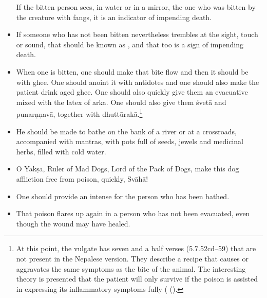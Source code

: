 \begin{translation}
\begin{itemize}
If the bitten person sees, in water or in a mirror, the one who was bitten by 
the creature with fangs, it is an indicator of impending death.

\item [48cd--49ab]

If someone who has not been bitten nevertheless trembles at the sight, touch 
or sound, that should be known as , and that too 
is a sign of impending death.

\item[50cd--52ab]
        
When one is bitten, one should make that bite flow and then it should
be  with ghee.  One should anoint it with
antidotes and one should also make the patient
drink aged ghee.  One should also quickly give them an evacuative
mixed with the latex of \gls{arka}.  One should also give them
\gls{śvetā} and \gls{punarṇṇavā}, together with
\gls{dhuttūrakā}.\footnote{At this point, the vulgate has seven and a
    half verses (5.7.52cd--59) that are not present in the Nepalese
    version.  They describe a recipe that causes or aggravates the same
    symptoms as the bite of the animal. The interesting theory is
    presented that the patient will only survive if the poison is
    assisted in expressing its inflammatory symptoms fully
    (
    ().}

\item[5.7.60--60.1]

He should be made to bathe on the bank of a river or at a crossroads, 
accompanied with mantras, with pots full of seeds, jewels and medicinal 
herbs, filled with cold water.

\item[5.7.61--62ab]

O Yakṣa, Ruler of Mad Dogs, Lord of the Pack of Dogs, make this dog 
affliction free from poison, quickly, Svāhā!


\item[5.7.62cd]

One should provide an intense  for the person 
who has been bathed. 

\item[5.7.63]

That poison flares up again in a person who has not been evacuated, even 
though the wound may have healed. 


\end{itemize}
\end{translation}
